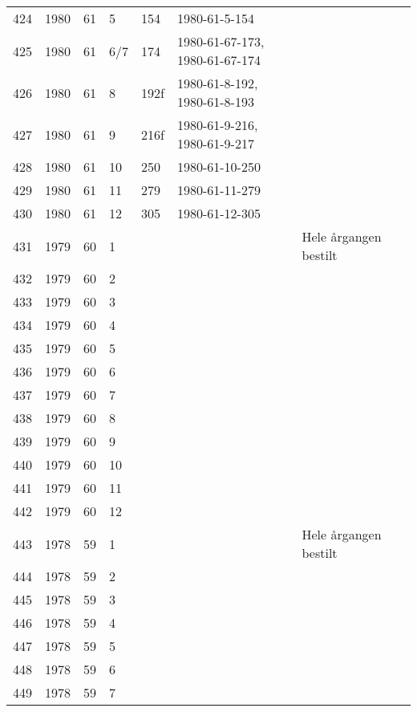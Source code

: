 \begin{longtable}{ |l|l|l|l|l|l|l|l| }
424 & 1980 & 61 &     5 &     154 & 1980-61-5-154  &  & \\
425 & 1980 & 61 &   6/7 &     174 & 1980-61-67-173, 1980-61-67-174 &  & \\
426 & 1980 & 61 &     8 &    192f & 1980-61-8-192, 1980-61-8-193 &  & \\
427 & 1980 & 61 &     9 &    216f & 1980-61-9-216, 1980-61-9-217 &  & \\
428 & 1980 & 61 &    10 &     250 & 1980-61-10-250 &  & \\
429 & 1980 & 61 &    11 &     279 & 1980-61-11-279 &  & \\
430 & 1980 & 61 &    12 &     305 & 1980-61-12-305 &  & \\
431 & 1979 & 60 &     1 &         &                & Hele årgangen bestilt & \\
432 & 1979 & 60 &     2 &         &                &  & \\
433 & 1979 & 60 &     3 &         &                &  & \\
434 & 1979 & 60 &     4 &         &                &  & \\
435 & 1979 & 60 &     5 &         &                &  & \\
436 & 1979 & 60 &     6 &         &                &  & \\
437 & 1979 & 60 &     7 &         &                &  & \\
438 & 1979 & 60 &     8 &         &                &  & \\
439 & 1979 & 60 &     9 &         &                &  & \\
440 & 1979 & 60 &    10 &         &                &  & \\
441 & 1979 & 60 &    11 &         &                &  & \\
442 & 1979 & 60 &    12 &         &                &  & \\
443 & 1978 & 59 &     1 &         &                & Hele årgangen bestilt & \\
444 & 1978 & 59 &     2 &         &                &  & \\
445 & 1978 & 59 &     3 &         &                &  & \\
446 & 1978 & 59 &     4 &         &                &  & \\
447 & 1978 & 59 &     5 &         &                &  & \\
448 & 1978 & 59 &     6 &         &                &  & \\
449 & 1978 & 59 &     7 &         &                &  & \\

\end{longtable}
